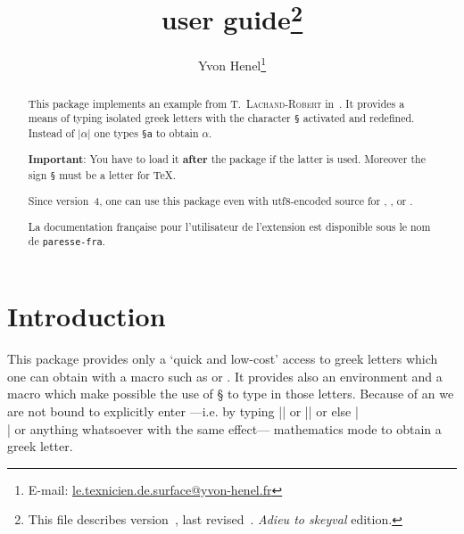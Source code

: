 \documentclass[full, english]{l3doc}
\newcommand*\PS{\texttt{\S}\xspace}
\newcommand*\PSVerb[1]{\texttt{\S #1}}
\begin{document}
\title{ user guide\thanks{This file describes
    version~\ExplFileVersion, last revised~\ExplFileDate. \emph{Adieu to
      skeyval} edition.}}
\author{Yvon Henel\thanks{E-mail:
    \href{mailto:le.texnicien.de.surface@yvon-henel.fr}
    {le.texnicien.de.surface@yvon-henel.fr}}}
\maketitle
\noindent\hrulefill

\begin{abstract}
  This package implements an example from T.~\textsc{Lachand-Robert}
  in~\cite{tlachand}. It provides a means of typing isolated greek letters
  with the character \PS activated and redefined. Instead of |\(\alpha\)| one
  types \PSVerb{a} to obtain \(\alpha\).

  \textbf{Important}: You have to load it \textbf{after} the 
  package if the latter is used. Moreover the sign \PS must be a letter for
  \TeX.

  Since version~4, one can use this package even with utf8-encoded source for
  , , or .
\end{abstract}

\noindent\hrulefill

 \begin{otherlanguage}{french}
\begin{abstract}
La documentation française pour l'utilisateur de l'extension
 est disponible sous le nom de \texttt{paresse-fra}.
\end{abstract}
\end{otherlanguage}

\noindent\hrulefill
\vspace{\baselineskip}

\tableofcontents{}


\section{Introduction}
\label{sec:introduction}

This package provides only a `quick and low-cost' access to greek letters
which one can obtain with a macro such as  or . It
provides also an environment and a macro which make possible the use of §
to type in those letters. Because of an  we are not bound to
explicitly enter ---i.e. by typing |$ $| or |\( \)| or else |\[ \]| or
anything whatsoever with the same effect--- mathematics mode to obtain a
greek letter.
\end{document}
